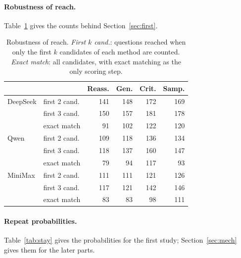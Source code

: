 \documentclass[11pt]{article}
\newcommand{\ds}{DeepSeek}
\newcommand{\qw}{Qwen}
\newcommand{\mm}{MiniMax}
\begin{document}
\paragraph{Robustness of reach.}
Table~\ref{tab:robust} gives the counts behind Section~\ref{sec:first}.

\begin{table}[h]
\centering
\small
\setlength{\tabcolsep}{4pt}
\begin{tabular}{@{}ll rrrr@{}}
\toprule
 & & Reass. & Gen. & Crit. & Samp. \\
\midrule
\ds & first 2 cand. & 141 & 148 & 172 & 169 \\
 & first 3 cand. & 150 & 157 & 181 & 178 \\
 & exact match & 91 & 102 & 122 & 120 \\
\qw & first 2 cand. & 109 & 118 & 136 & 134 \\
 & first 3 cand. & 118 & 137 & 160 & 147 \\
 & exact match & 79 & 94 & 117 & 93 \\
\mm & first 2 cand. & 111 & 111 & 121 & 126 \\
 & first 3 cand. & 117 & 121 & 142 & 146 \\
 & exact match & 83 & 83 & 98 & 111 \\
\bottomrule
\end{tabular}
\caption{Robustness of reach. \emph{First $k$ cand.}: questions reached when only the first $k$ candidates of each method are counted. \emph{Exact match}: all candidates, with exact matching as the only scoring step.}
\label{tab:robust}
\end{table}

\paragraph{Repeat probabilities.}
Table~\ref{tab:stay} gives the probabilities for the first study; Section~\ref{sec:mech} gives them for the later parts.
\end{document}

